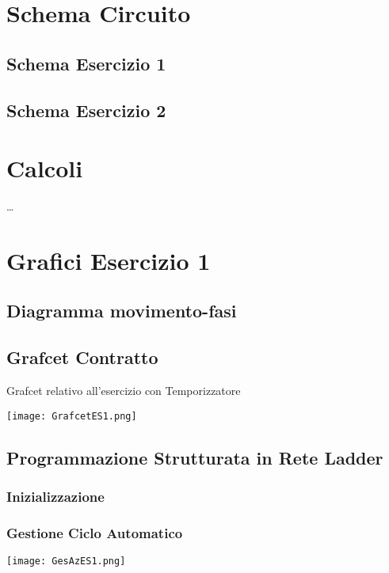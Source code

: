\documentclass[a4paper]{article}
\begin{document}
\section{Schema Circuito}
\subsection{Schema Esercizio 1}

\begin{center}
\end{center}

\subsection{Schema Esercizio 2}
\begin{center}
\end{center}


\section{Calcoli}
\dots
\clearpage

\section{Grafici Esercizio 1}

\subsection{Diagramma movimento-fasi}
\subsection{Grafcet Contratto}
Grafcet relativo all'esercizio con Temporizzatore
\begin{center}
\texttt{[image: GrafcetES1.png]}
\end{center}
\subsection{Programmazione Strutturata in Rete Ladder}
\subsubsection{Inizializzazione}
\subsubsection{Gestione Ciclo Automatico}
\begin{center}
\texttt{[image: GesAzES1.png]}
\end{center}
\end{document}
